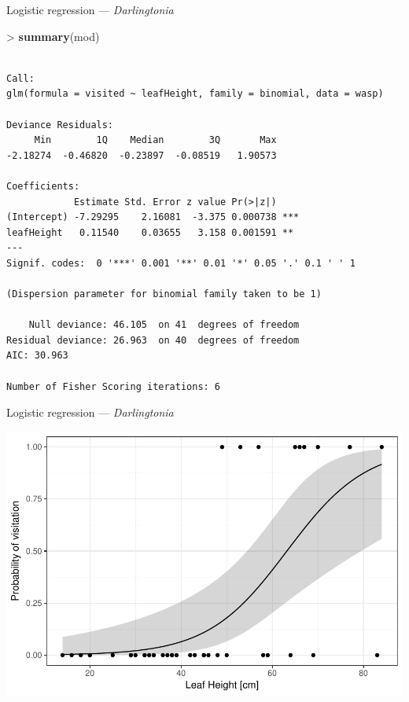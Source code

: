 \documentclass[10pt,ignorenonframetext,compress, aspectratio=169]{beamer}
\newenvironment{Shaded}{\begin{snugshade}}{\end{snugshade}}
\newcommand{\KeywordTok}[1]{\textcolor[rgb]{0.13,0.29,0.53}{\textbf{{#1}}}}
\newcommand{\StringTok}[1]{\textcolor[rgb]{0.31,0.60,0.02}{{#1}}}
\newcommand{\NormalTok}[1]{{#1}}
\begin{document}
\begin{frame}[fragile]{Logistic regression --- \emph{Darlingtonia}}

\begin{Shaded}
\begin{Highlighting}[]
\NormalTok{>}\StringTok{ }\KeywordTok{summary}\NormalTok{(mod)}
\end{Highlighting}
\end{Shaded}

\begin{verbatim}

Call:
glm(formula = visited ~ leafHeight, family = binomial, data = wasp)

Deviance Residuals: 
     Min        1Q    Median        3Q       Max  
-2.18274  -0.46820  -0.23897  -0.08519   1.90573  

Coefficients:
            Estimate Std. Error z value Pr(>|z|)    
(Intercept) -7.29295    2.16081  -3.375 0.000738 ***
leafHeight   0.11540    0.03655   3.158 0.001591 ** 
---
Signif. codes:  0 '***' 0.001 '**' 0.01 '*' 0.05 '.' 0.1 ' ' 1

(Dispersion parameter for binomial family taken to be 1)

    Null deviance: 46.105  on 41  degrees of freedom
Residual deviance: 26.963  on 40  degrees of freedom
AIC: 30.963

Number of Fisher Scoring iterations: 6
\end{verbatim}

\end{frame}

\begin{frame}{Logistic regression --- \emph{Darlingtonia}}

\begin{center}\includegraphics[width=0.7\linewidth]{01-glms_files/figure-beamer/plot-darlingtonia-1} \end{center}

\end{frame}
\end{document}
